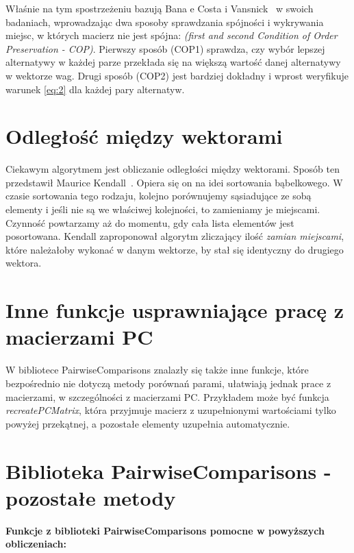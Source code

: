Właśnie na tym spostrzeżeniu bazują Bana e Costa i Vansnick~\cite{A14} w swoich badaniach, wprowadzając dwa sposoby sprawdzania spójności i wykrywania miejsc, w których macierz nie jest spójna: \textit{(first and second Condition of Order Preservation - COP)}. Pierwszy sposób (COP1) sprawdza, czy wybór lepszej alternatywy w każdej parze przekłada się na większą wartość danej alternatywy w wektorze wag. Drugi sposób (COP2) jest bardziej dokładny i wprost weryfikuje warunek \ref{eq:2} dla każdej pary alternatyw.

\section{Odległość między wektorami}
\label{subsec:kendall}
Ciekawym algorytmem jest obliczanie odległości między wektorami. Sposób ten przedstawił Maurice Kendall~\cite{A15}. Opiera się on na idei sortowania bąbelkowego. W czasie sortowania tego rodzaju, kolejno porównujemy sąsiadujące ze sobą elementy i jeśli nie są we właściwej kolejności, to zamieniamy je miejscami. Czynność powtarzamy aż do momentu, gdy cała lista elementów jest posortowana. Kendall zaproponował algorytm zliczający ilość \textit{zamian miejscami}, które należałoby wykonać w danym wektorze, by stał się identyczny do drugiego wektora.

\section{Inne funkcje usprawniające pracę z macierzami PC}
\label{subsec:inne}
W bibliotece PairwiseComparisons znalazły się także inne funkcje, które bezpośrednio nie dotyczą metody porównań parami, ułatwiają jednak prace z macierzami, w szczególności z macierzami PC. Przykładem może być funkcja \textit{recreatePCMatrix}, która przyjmuje macierz z uzupełnionymi wartościami tylko powyżej przekątnej, a pozostałe elementy uzupełnia automatycznie.

\newpage
\section{Biblioteka PairwiseComparisons - pozostałe metody}
\label{subsec:pozostałe}

\textbf{Funkcje z biblioteki PairwiseComparisons pomocne w powyższych obliczeniach:}
\\

